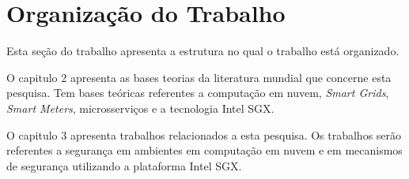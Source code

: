\lipsum[3-56]


\lipsum[3-56]




    




\section{Organização do Trabalho}
Esta seção do trabalho apresenta a estrutura no qual o trabalho está organizado.

O capitulo 2 apresenta as bases teorias da literatura mundial que concerne esta pesquisa. Tem bases teóricas referentes a computação em nuvem, \textit{Smart Grids}, \textit{Smart Meters}, microsserviços e a tecnologia Intel SGX. 

O capitulo 3 apresenta trabalhos relacionados a esta pesquisa. Os trabalhos serão referentes a segurança em ambientes em computação em nuvem e em mecanismos de segurança utilizando a plataforma Intel SGX.


